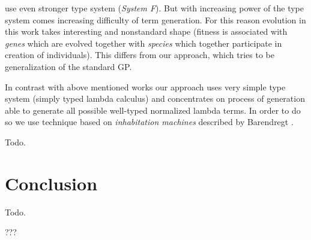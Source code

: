 \documentclass[11pt]{article}
\begin{document}
\begin{article}
\cite{binard2008genetic} use even 
stronger type system (\textit{System F}).  
But with increasing power of the type system comes increasing difficulty of term generation.
For this reason evolution in this work takes interesting and nonstandard shape 
(fitness is associated with \textit{genes} which are evolved together with \textit{species}
which together participate in creation of individuals).
This differs from our approach, which tries to be generalization of
the standard GP\cite{koza92}.

In contrast with above mentioned works our approach uses very simple type system 
(simply typed lambda calculus) and concentrates on process of generation  
able to generate all possible well-typed normalized lambda terms. In order to do
so we use technique based on \textit{inhabitation machines} 
described by Barendregt \cite{barendregt10}.    





Todo.

\section{Conclusion}
Todo.


\acknowledgments %
{???}



\end{article}
\end{document}
